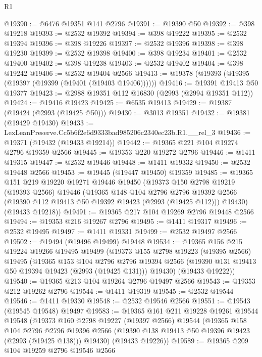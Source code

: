\begin{lexlean}{R1}
\begin{coremodule}
@19390 := @6476 @19351 @141 @2796
@19391 := @19390 @50
@19392 := @398 @19218
@19393 := @2532 @19392
@19394 := @398 @19222
@19395 := @2532 @19394
@19396 := @398 @19226
@19397 := @2532 @19396
@19398 := @398 @19230
@19399 := @2532 @19398
@19400 := @398 @19234
@19401 := @2532 @19400
@19402 := @398 @19238
@19403 := @2532 @19402
@19404 := @398 @19242
@19406 := @2532 @19404 @2566
@19413 := @19378 (@19393 (@19395 (@19397 (@19399 (@19401 (@19403 @19406))))))
@19416 := @19391 @19413 @50 @19377
@19423 := @2988 @19351 @112 @16830 (@2993 (@2994 @19351 @112))
@19424 := @19416 @19423
@19425 := @6535 @19413
@19429 := @19387 (@19424 (@2993 (@19425 @50)))
@19430 := @3013 @19351
@19432 := @19381 (@19429 @19430)
@19433 := LexLeanPreserve.Cc5b6f2e6d9333bad985206c2340ec23b.R1.__rel_3
@19436 := @19371 (@19432 (@19433 @19214))
@19442 := @19365 @221 @104 @19274 @2796 @19359 @2566
@19445 := @19353 @220 @19272 @2796
@19446 := @1411 @19315
@19447 := @2532 @19446
@19448 := @1411 @19332
@19450 := @2532 @19448 @2566
@19453 := @19445 (@19447 @19450) @19359
@19485 := @19365
    @151
    @219
    @19220
    @19271
    @19446
    @19450
    (@19373
      @150
      @2798
      @19219
      (@19393 @2566)
      @19446
      (@19365
        @148
        @104
        @2796
        @2796
        @19392
        @2566
        (@19390 @112 @19413 @50 @19392 @19423 (@2993 (@19425 @112)))
        @19430)
      (@19433 @19218))
@19491 := @19365 @217 @104 @19269 @2796 @19448 @2566
@19494 := @19353 @216 @19267 @2796
@19495 := @1411 @19317
@19496 := @2532 @19495
@19497 := @1411 @19331
@19499 := @2532 @19497 @2566
@19502 := @19494 (@19496 @19499) @19448
@19534 := @19365
    @156
    @215
    @19224
    @19266
    @19495
    @19499
    (@19373
      @155
      @2798
      @19223
      (@19395 @2566)
      @19495
      (@19365
        @153
        @104
        @2796
        @2796
        @19394
        @2566
        (@19390 @131 @19413 @50 @19394 @19423 (@2993 (@19425 @131)))
        @19430)
      (@19433 @19222))
@19540 := @19365 @213 @104 @19264 @2796 @19497 @2566
@19543 := @19353 @212 @19262 @2796
@19544 := @1411 @19319
@19545 := @2532 @19544
@19546 := @1411 @19330
@19548 := @2532 @19546 @2566
@19551 := @19543 (@19545 @19548) @19497
@19583 := @19365
    @161
    @211
    @19228
    @19261
    @19544
    @19548
    (@19373
      @160
      @2798
      @19227
      (@19397 @2566)
      @19544
      (@19365
        @158
        @104
        @2796
        @2796
        @19396
        @2566
        (@19390 @138 @19413 @50 @19396 @19423 (@2993 (@19425 @138)))
        @19430)
      (@19433 @19226))
@19589 := @19365 @209 @104 @19259 @2796 @19546 @2566

\end{coremodule}
\end{lexlean}
